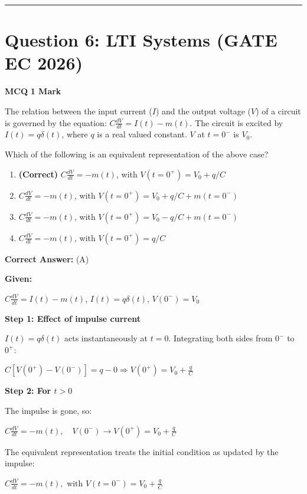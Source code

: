 \documentclass[11pt,a4paper]{article}
\begin{document}
\vspace{1.5em}
\hrule
\vspace{1.5em}

\section*{Question 6: LTI Systems (GATE EC 2026)}
\noindent \textbf{\color{primary}MCQ} \hfill \textbf{\color{secondary}1 Mark}


\noindent The relation between the input current ($I$) and the output voltage ($V$) of a circuit is governed by the equation: $C\frac{dV}{dt} = I(t) - m(t)$. The circuit is excited by $I(t) = q\delta(t)$, where $q$ is a real valued constant. $V$ at $t = 0^-$ is $V_0$. 

Which of the following is an equivalent representation of the above case?


\begin{enumerate}[label=(\Alph*)]
    \item \textbf{(Correct)} $C\frac{dV}{dt} = -m(t)$, with $V(t = 0^+) = V_0 + q/C$
    \item $C\frac{dV}{dt} = -m(t)$, with $V(t = 0^+) = V_0 + q/C + m(t = 0^-)$
    \item $C\frac{dV}{dt} = -m(t)$, with $V(t = 0^+) = V_0 - q/C + m(t = 0^-)$
    \item $C\frac{dV}{dt} = -m(t)$, with $V(t = 0^+) = q/C$
\end{enumerate}

\noindent \textbf{Correct Answer:} (A)

\begin{tcolorbox}[solbox, title=Detailed Solution -- Question 6]
\textbf{Given:}

$C\frac{dV}{dt} = I(t) - m(t)$, $I(t) = q\delta(t)$, $V(0^-) = V_0$

\textbf{Step 1: Effect of impulse current}

$I(t) = q\delta(t)$ acts instantaneously at $t=0$. Integrating both sides from $0^-$ to $0^+$:

$C[V(0^+) - V(0^-)] = q - 0 \Rightarrow V(0^+) = V_0 + \frac{q}{C}$

\textbf{Step 2: For $t > 0$}

The impulse is gone, so:

$C\frac{dV}{dt} = -m(t),\quad V(0^-)\to V(0^+) = V_0 + \frac{q}{C}$

The equivalent representation treats the initial condition as updated by the impulse:

$C\frac{dV}{dt} = -m(t),\text{ with } V(t=0^-) = V_0 + \frac{q}{C}$
\end{tcolorbox}
\end{document}
